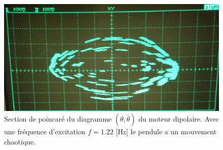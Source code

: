 \documentclass[a4paper,12pt,oneside]{article}
\begin{document}
\begin{figure}[h!]
  \begin{center}
  \includegraphics[width=0.5\linewidth,angle=0]{./figures/chao_1_22Hz_v2.png}
  \caption{Section de poincaré du diagramme $(\theta,\dot{\theta})$ du moteur dipolaire. Avec une fréquence d'excitation $f=1.22$ [Hz] le pendule a un mouvement chaotique.} \label{fig:chaos}
  \end{center}
\end{figure}








\end{document}
